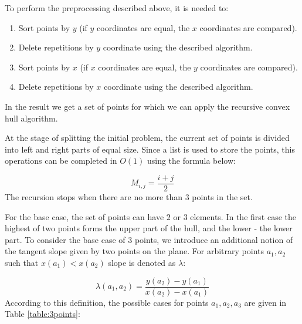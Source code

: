 \documentclass[sigconf]{acmart}
\begin{document}
		To perform the preprocessing described above, it is needed to:
		
		\begin{enumerate}
			\item
			Sort points by $y$ (if $y$ coordinates are equal, the $x$ coordinates are compared).
			\item
			Delete repetitions by $y$ coordinate using the described algorithm.
			\item
			Sort points by $x$ (if $x$ coordinates are equal, the $y$ coordinates are compared).
			\item
			Delete repetitions by $x$ coordinate using the described algorithm.
		\end{enumerate}
	
		In the result we get a set of points for which we can apply the recursive convex hull algorithm.
		

		
		At the stage of splitting the initial problem, the current set of points is divided into left and right parts of equal size. Since a list is used to store the points, this operations can be completed in $O(1)$ using the formula below:
		
		\begin{equation}
			M_{i,j}=\frac{i+j}{2}
		\end{equation}
		The recursion stops when there are no more than $3$ points in the set.
		
		For the base case, the set of points can have $2$ or $3$ elements. In the first case the highest of two points forms the upper part of the hull, and the lower - the lower part.
		To consider the base case of $3$ points, we introduce an additional notion of the tangent slope given by two points on the plane. For arbitrary points $a_1, a_2$ such that $x(a_1)<x(a_2)$ slope is denoted as $\lambda$:
		
		\begin{equation}
			\lambda(a_1, a_2)=\frac{y(a_2)-y(a_1)}{x(a_2)-x(a_1)}
		\end{equation}
		According to this definition, the possible cases for points $a_1,a_2,a_3$ are given in Table \ref{table:3points}:
		
\end{document}
